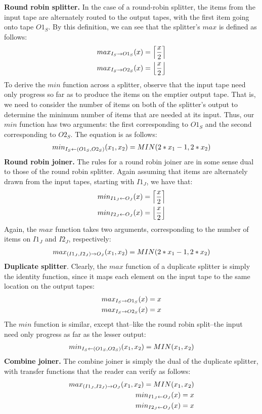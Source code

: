 {\bf Round robin splitter.}  In the case of a round-robin splitter, the
items from the input tape are alternately routed to the output tapes,
with the first item going onto tape $O1_S$.  By this definition, we
can see that the splitter's $max$ is defined as follows:
\begin{eqnarray*}
max_{I_S \rightarrow O1_S}(x) = \left\lceil\frac{x}{2}\right\rceil \\
max_{I_S \rightarrow O2_S}(x) = \left\lfloor\frac{x}{2}\right\rfloor
\end{eqnarray*}
To derive the $min$ function across a splitter, observe that the input
tape need only progress so far as to produce the items on the emptier
output tape.  That is, we need to consider the number of items on both
of the splitter's output to determine the minimum number of items that
are needed at its input.  Thus, our $min$ function has two arguments:
the first corresponding to $O1_S$ and the second corresponding to
$O2_S$.  The equation is as follows:
\begin{eqnarray*}
min_{I_S \leftarrow (O1_S, O2_S)}(x_1, x_2) = MIN(2*x_1-1, 2*x_2)
\end{eqnarray*}
{\bf Round robin joiner.}  The rules for a round robin joiner are in
some sense dual to those of the round robin splitter.  Again assuming
that items are alternately drawn from the input tapes, starting with
$I1_J$, we have that:
\begin{eqnarray*}
min_{I1_J \leftarrow O_J}(x) = \left\lceil\frac{x}{2}\right\rceil \\
min_{I2_J \leftarrow O_J}(x) = \left\lfloor\frac{x}{2}\right\rfloor
\end{eqnarray*}
Again, the $max$ function takes two arguments, corresponding to the
number of items on $I1_J$ and $I2_J$, respectively:
\begin{eqnarray*}
max_{(I1_J, I2_J) \rightarrow O_J}(x_1, x_2) = MIN(2*x_1-1, 2*x_2)
\end{eqnarray*}
{\bf Duplicate splitter}.  Clearly, the $max$ function of a duplicate
splitter is simply the identity function, since it maps each element
on the input tape to the same location on the output tapes:
\begin{eqnarray*}
max_{I_S \rightarrow O1_S}(x) = x \\
max_{I_S \rightarrow O2_S}(x) = x
\end{eqnarray*}
The $min$ function is similar, except that--like the round robin
split--the input need only progress as far as the lesser output:
\begin{eqnarray*}
min_{I_S \leftarrow (O1_S, O2_S)}(x_1, x_2) = MIN(x_1, x_2)
\end{eqnarray*}
{\bf Combine joiner.} The combine joiner is simply the dual of the
duplicate splitter, with transfer functions that the reader can verify
as follows:
\begin{eqnarray*}
max_{(I1_J, I2_J) \rightarrow O_J}(x_1, x_2) = MIN(x_1, x_2) \\
min_{I1_J \leftarrow O_J}(x) = x \\
min_{I2_J \leftarrow O_J}(x) = x
\end{eqnarray*}

